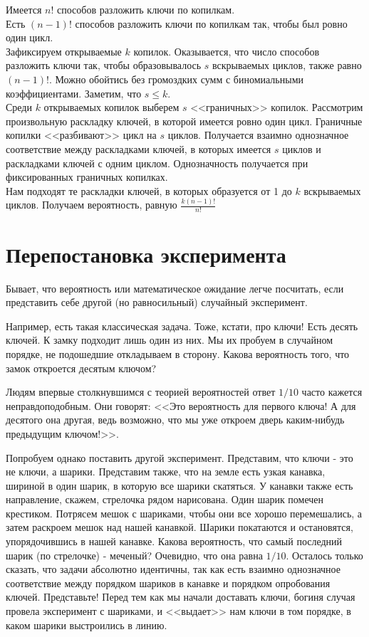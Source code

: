 \documentclass[pdftex,12pt,a4paper]{article}
\begin{document}
Имеется $n!$ способов разложить ключи по копилкам. \\
Есть $(n-1)!$ способов разложить ключи по копилкам так, чтобы был
ровно один цикл. \\
Зафиксируем открываемые $k$ копилок. Оказывается, что число
способов разложить ключи так, чтобы образовывалось $s$ вскрываемых
циклов, также равно $(n-1)!$. Можно обойтись без громоздких сумм с
биномиальными коэффициентами. Заметим, что $s\le k$. \\
Среди $k$ открываемых копилок выберем $s$ <<граничных>> копилок.
Рассмотрим произвольную раскладку ключей, в которой имеется ровно
один цикл. Граничные копилки <<разбивают>> цикл на $s$ циклов.
Получается взаимно однозначное соответствие между раскладками
ключей, в которых имеется $s$ циклов и раскладками ключей с одним
циклом. Однозначность получается при фиксированных граничных
копилках. \\
Нам подходят те раскладки ключей, в которых образуется от 1 до $k$
вскрываемых циклов. Получаем вероятность, равную
$\frac{k(n-1)!}{n!}$ \\

\section{Перепостановка эксперимента}
Бывает, что вероятность или математическое ожидание легче посчитать, если представить себе другой (но равносильный) случайный эксперимент.

Например, есть такая классическая задача. Тоже, кстати, про ключи! Есть десять ключей. К замку подходит лишь один из них. Мы их пробуем в случайном порядке, не подошедшие откладываем в сторону. Какова вероятность того, что замок откроется десятым ключом?

Людям впервые столкнувшимся с теорией вероятностей ответ $1/10$ часто кажется неправдоподобным. Они говорят: <<Это вероятность для первого ключа! А для десятого она другая, ведь возможно, что мы уже откроем дверь каким-нибудь предыдущим ключом!>>.

Попробуем однако поставить другой эксперимент. Представим, что ключи - это не ключи, а шарики. Представим также, что на земле есть узкая канавка, шириной в один шарик, в которую все шарики скатяться. У канавки также есть направление, скажем, стрелочка рядом нарисована. Один шарик помечен крестиком. Потрясем мешок с шариками, чтобы они все хорошо перемешались, а затем раскроем мешок над нашей канавкой. Шарики покатаются и остановятся, упорядочившись в нашей канавке. Какова вероятность, что самый последний шарик (по стрелочке) - меченый? Очевидно, что она равна $1/10$. Осталось только сказать, что задачи абсолютно идентичны, так как есть взаимно однозначное соответствие между порядком шариков в канавке и порядком опробования ключей. Представьте! Перед тем как мы начали доставать ключи, богиня случая провела эксперимент с шариками, и <<выдает>> нам ключи в том порядке, в каком шарики выстроились в линию.
\end{document}
